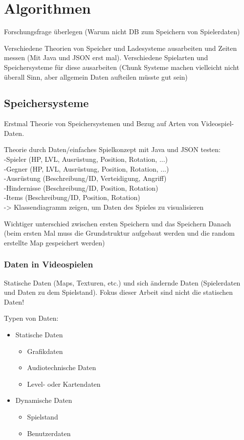 \chapter{Algorithmen}\label{ch:algorithmen}
Forschungsfrage überlegen (Warum nicht DB zum Speichern von Spielerdaten)

Verschiedene Theorien von Speicher und Ladesysteme ausarbeiten und Zeiten 
messen (Mit Java und JSON erst mal). Verschiedene Spielarten und Speichersysteme
für diese ausarbeiten (Chunk Systeme machen vielleicht nicht überall Sinn, aber 
allgemein Daten aufteilen müsste gut sein)

\section{Speichersysteme}
Erstmal Theorie von Speichersystemen und Bezug auf Arten von Videospiel-Daten.

Theorie durch Daten/einfaches Spielkonzept mit Java und JSON testen:\\
-Spieler (HP, LVL, Ausrüstung, Position, Rotation, ...)\\
-Gegner (HP, LVL, Ausrüstung, Position, Rotation, ...)\\
-Ausrüstung (Beschreibung/ID, Verteidigung, Angriff)\\
-Hindernisse (Beschreibung/ID, Position, Rotation)\\
-Items (Beschreibung/ID, Position, Rotation)\\
-> Klassendiagramm zeigen, um Daten des Spieles zu visualisieren

Wichtiger unterschied zwischen ersten Speichern und das Speichern Danach
(beim ersten Mal muss die Grundstruktur aufgebaut werden und die random
erstellte Map gespeichert werden)

\subsection{Daten in Videospielen}
Statische Daten (Maps, Texturen, etc.) und sich ändernde Daten (Spielerdaten und 
Daten zu dem Spielstand). Fokus dieser Arbeit sind nicht die statischen Daten!

Typen von Daten:\\
\begin{itemize}
    \item Statische Daten
    \begin{itemize}
        \item Grafikdaten
        \item Audiotechnische Daten
        \item Level- oder Kartendaten
    \end{itemize}
    \item Dynamische Daten
    \begin{itemize}
        \item Spielstand
        \item Benutzerdaten
    \end{itemize}
\end{itemize}

